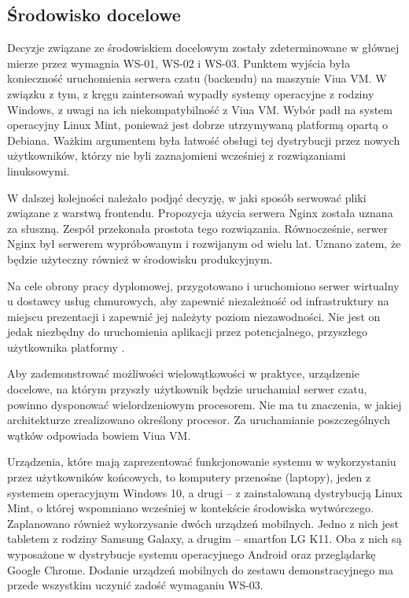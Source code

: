 \subsection{Środowisko docelowe}
Decyzje związane ze środowiskiem docelowym zostały zdeterminowane w głównej
mierze przez wymagnia WS-01, WS-02 i WS-03. Punktem wyjścia była konieczność
uruchomienia serwera czatu (backendu) na maszynie Viua VM. W związku z tym,
z kręgu zaintersowań wypadły systemy operacyjne z rodziny Windows, z uwagi na
ich niekompatybilność z Viua VM. Wybór padł na system operacyjny Linux Mint,
ponieważ jest dobrze utrzymywaną platformą opartą o Debiana. Ważkim argumentem
była łatwość obsługi tej dystrybucji przez nowych użytkowników, którzy nie byli zaznajomieni wcześniej z rozwiązaniami linuksowymi.

W dalszej kolejności należało podjąć decyzję, w jaki sposób serwować pliki
związane z warstwą frontendu. Propozycja użycia serwera Nginx została uznana
za słuszną. Zespół przekonała prostota tego rozwiązania. Równocześnie, serwer
Nginx był serwerem wypróbowanym i rozwijanym od wielu lat. Uznano zatem, że
będzie użyteczny również w środowisku produkcyjnym.

Na cele obrony pracy dyplomowej, przygotowano i uruchomiono serwer wirtualny u
dostawcy usług chmurowych, aby zapewnić niezależność od infrastruktury na
miejscu prezentacji i zapewnić jej należyty poziom niezawodności. Nie jest
on jedak niezbędny do uruchomienia aplikacji przez potencjalnego, przyszłego
użytkownika platformy \ViuAct.

Aby zademonstrować możliwości wielowątkowości w praktyce, urządzenie docelowe,
na którym przyszły użytkownik będzie uruchamiał serwer czatu, powinno dysponować
wielordzeniowym procesorem. Nie ma tu znaczenia, w jakiej architekturze
zrealizowano określony procesor. Za uruchamianie poszczególnych wątków odpowiada
bowiem Viua VM.

Urządzenia, które mają zaprezentować funkcjonowanie systemu w wykorzystaniu
przez użytkowników końcowych, to komputery przenośne (laptopy), jeden z systemem
operacyjnym Windows 10, a drugi -- z zainstalowaną dystrybucją Linux Mint, o
której wspomniano wcześniej w kontekście środowiska wytwórczego. Zaplanowano
również wykorzysanie dwóch urządzeń mobilnych. Jedno z nich jest tabletem z
rodziny Samsung Galaxy, a drugim -- smartfon LG K11. Oba z nich są wyposażone
w dystrybucje systemu operacyjnego Android oraz przeglądarkę Google Chrome.
Dodanie urządzeń mobilnych do zestawu demonstracyjnego ma przede wszystkim
uczynić zadość wymaganiu WS-03.

